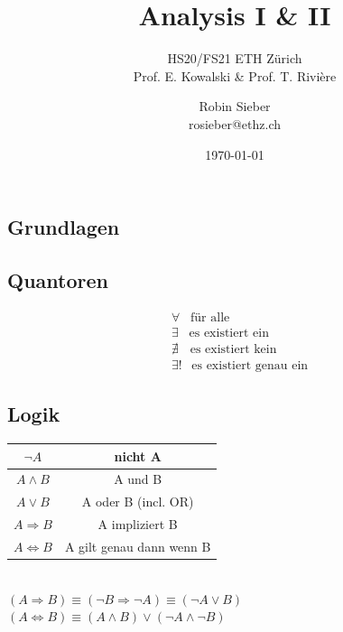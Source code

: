 \documentclass[8pt, a4paper, landscape, fleqn]{scrartcl}
\title{Analysis I \& II}
\subtitle{HS20/FS21 ETH Zürich \\Prof. E. Kowalski \& Prof. T. Rivière}
\author{Robin Sieber \\ rosieber@ethz.ch}
\date{\today}
\begin{document}
	\begin{multicols*}{3}
		\maketitle
		\section{Grundlagen}
		    \subsection{Quantoren}
		    	\vspace{-8pt}
				\begin{align*}
					&\forall \hspace{10pt} \text{für alle}\\
					&\exists \hspace{10pt} \text{es existiert ein}\\
					&\nexists \hspace{11pt} \text{es existiert kein}\\
					&\exists! \hspace{9pt} \text{es existiert genau ein}
				\end{align*}
			\subsection{Logik}
		        \begin{tabular}{|c|c|}
					\hline
					$\lnot A$ & nicht A \\
					\hline
					$A \land B$ &  A und B\\
					\hline
					$A\lor B$ & A oder B (incl. OR)\\
					\hline
					$A\Rightarrow B$ & A impliziert B \\
					\hline
					$A\Leftrightarrow B$ & A gilt genau dann wenn B \\
					\hline 
				\end{tabular}\\[3pt]
				$(A \Rightarrow B) \equiv (\lnot B \Rightarrow \lnot A) \equiv (\lnot A \lor B)$\\
				$(A \Leftrightarrow B) \equiv (A \land B) \lor (\lnot A \land \lnot B)$

\end{multicols*}
\end{document}
